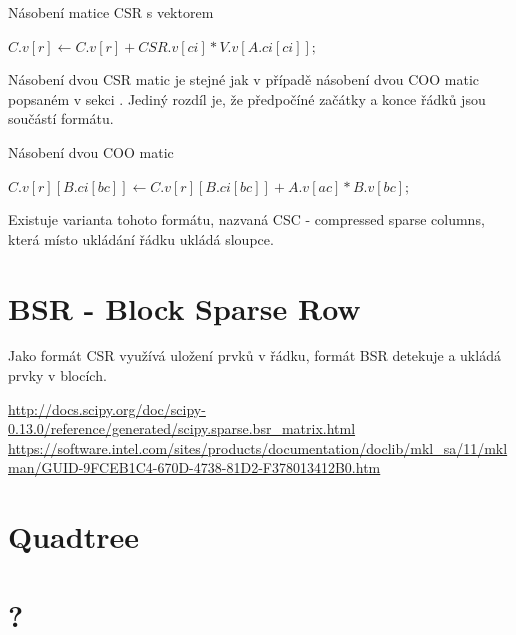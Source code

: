 \begin{algorithm}[H]
	\caption{Násobení matice CSR s vektorem}\label{csr-mvm}
	\begin{algorithmic}[1]
				\State \texttt{$C.v[r] \gets C.v[r] + CSR.v[ci] * V.v[A.ci[ci]];$}
			\EndFor
		\EndFor
		\EndProcedure
	\end{algorithmic}
\end{algorithm}

Násobení dvou CSR matic je stejné jak v případě násobení dvou COO matic popsaném v sekci . Jediný rozdíl je, že předpočíné začátky a konce řádků jsou součástí formátu.

\label{alg:csr-mmm}
\begin{algorithm}[H]
	\caption{Násobení dvou COO matic}\label{csr-mmm}
	\begin{algorithmic}[1]
					\State \texttt{$C.v[r][B.ci[bc]] \gets C.v[r][B.ci[bc]] + A.v[ac] * B.v[bc];$}
				\EndFor
			\EndFor
		\EndFor
		\EndProcedure
	\end{algorithmic}
\end{algorithm}

Existuje varianta tohoto formátu, nazvaná CSC - compressed sparse columns, která místo ukládání řádku ukládá sloupce.


\section{BSR - Block Sparse Row}

Jako formát CSR využívá uložení prvků v řádku, formát BSR detekuje a ukládá prvky v blocích.

\url{http://docs.scipy.org/doc/scipy-0.13.0/reference/generated/scipy.sparse.bsr_matrix.html}
\url{https://software.intel.com/sites/products/documentation/doclib/mkl_sa/11/mklman/GUID-9FCEB1C4-670D-4738-81D2-F378013412B0.htm}



\section{Quadtree}

\section{?}

